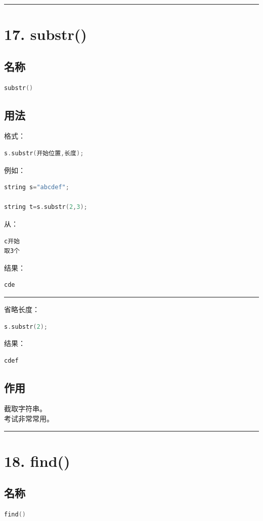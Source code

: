 \documentclass[9pt,twocolumn]{extarticle}
\begin{document}
\noindent\rule{\linewidth}{0.4pt}

\section{17. substr()}

\subsection{名称}
\begin{lstlisting}[language=C++]
substr()
\end{lstlisting}

\subsection{用法}
格式：
\begin{lstlisting}[language=C++]
s.substr(开始位置,长度);
\end{lstlisting}
例如：
\begin{lstlisting}[language=C++]
string s="abcdef";

string t=s.substr(2,3);
\end{lstlisting}
从：
\begin{lstlisting}
c开始
取3个
\end{lstlisting}
结果：
\begin{lstlisting}
cde
\end{lstlisting}

\noindent\rule{\linewidth}{0.4pt}

省略长度：
\begin{lstlisting}[language=C++]
s.substr(2);
\end{lstlisting}
结果：
\begin{lstlisting}
cdef
\end{lstlisting}

\subsection{作用}
截取字符串。\\
考试非常常用。

\noindent\rule{\linewidth}{0.4pt}

\section{18. find()}

\subsection{名称}
\begin{lstlisting}[language=C++]
find()
\end{lstlisting}
\end{document}
